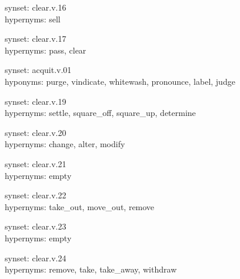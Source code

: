 {synset: clear.v.16\\
hypernyms: sell

synset: clear.v.17\\
hypernyms: pass, clear

synset: acquit.v.01\\
hyponyms: purge, vindicate, whitewash, pronounce, label, judge

synset: clear.v.19\\
hypernyms: settle, square\_off, square\_up, determine

synset: clear.v.20\\
hypernyms: change, alter, modify

synset: clear.v.21\\
hypernyms: empty

synset: clear.v.22\\
hypernyms: take\_out, move\_out, remove

synset: clear.v.23\\
hypernyms: empty

synset: clear.v.24\\
hypernyms: remove, take, take\_away, withdraw
}

